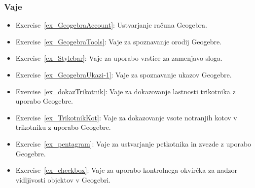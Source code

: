 \subsubsection{Vaje}\label{07_geogebraUvod_vaje}

\begin{itemize}
\item Exercise~\ref{ex_GeogebraAccount}: Ustvarjanje računa Geogebra.
\item Exercise~\ref{ex_GeogebraTools}: Vaje za spoznavanje orodij Geogebre.
\item Exercise~\ref{ex_Stylebar}: Vaje za uporabo vrstice za zamenjavo sloga.
\item Exercise~\ref{ex_GeogebraUkazi-1}: Vaje za spoznavanje ukazov Geogebre.
\item Exercise~\ref{ex_dokazTrikotnik}: Vaje za dokazovanje lastnosti trikotnika z uporabo Geogebre.
\item Exercise~\ref{ex_TrikotnikKot}: Vaje za dokazovanje vsote notranjih kotov v trikotniku z uporabo Geogebre.
\item Exercise~\ref{ex_pentagram}: Vaje za ustvarjanje petkotnika in zvezde z uporabo Geogebre.
\item Exercise~\ref{ex_checkbox}: Vaje za uporabo kontrolnega okvirčka za nadzor vidljivosti objektov v Geogebri.
\end{itemize}